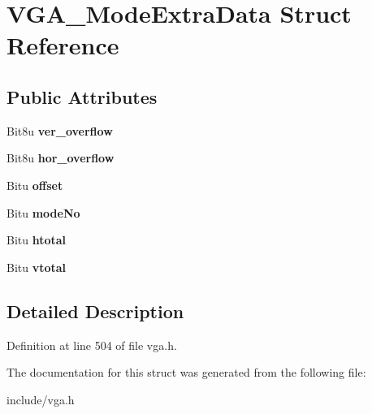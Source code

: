 \hypertarget{structVGA__ModeExtraData}{\section{V\-G\-A\-\_\-\-Mode\-Extra\-Data Struct Reference}
\label{structVGA__ModeExtraData}
}
\subsection*{Public Attributes}
\begin{DoxyCompactItemize}
\item 
\hypertarget{structVGA__ModeExtraData_a020b5a995f7d52935b5e4fb5899fe72d}{Bit8u {\bfseries ver\-\_\-overflow}}\label{structVGA__ModeExtraData_a020b5a995f7d52935b5e4fb5899fe72d}

\item 
\hypertarget{structVGA__ModeExtraData_a60204db357ea608c5f03a8d59c80d3ff}{Bit8u {\bfseries hor\-\_\-overflow}}\label{structVGA__ModeExtraData_a60204db357ea608c5f03a8d59c80d3ff}

\item 
\hypertarget{structVGA__ModeExtraData_a11bba06bf4bcd5cb9aca1442e5d9b368}{Bitu {\bfseries offset}}\label{structVGA__ModeExtraData_a11bba06bf4bcd5cb9aca1442e5d9b368}

\item 
\hypertarget{structVGA__ModeExtraData_a4af1e6bf83f95024c09802255715702a}{Bitu {\bfseries mode\-No}}\label{structVGA__ModeExtraData_a4af1e6bf83f95024c09802255715702a}

\item 
\hypertarget{structVGA__ModeExtraData_a21c6015134a307927a2ab9915c2dfb41}{Bitu {\bfseries htotal}}\label{structVGA__ModeExtraData_a21c6015134a307927a2ab9915c2dfb41}

\item 
\hypertarget{structVGA__ModeExtraData_a9410324359daa0b31e4026d9e70aeae0}{Bitu {\bfseries vtotal}}\label{structVGA__ModeExtraData_a9410324359daa0b31e4026d9e70aeae0}

\end{DoxyCompactItemize}


\subsection{Detailed Description}


Definition at line 504 of file vga.\-h.



The documentation for this struct was generated from the following file\-:\begin{DoxyCompactItemize}
\item 
include/vga.\-h\end{DoxyCompactItemize}
